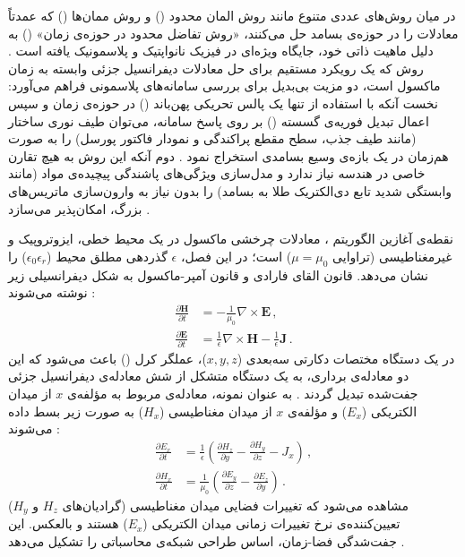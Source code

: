 \documentclass[12pt,a4paper]{report}
\begin{document}
در میان روش‌های عددی متنوع مانند روش المان محدود () و روش ممان‌ها () که عمدتاً معادلات را در حوزه‌ی بسامد حل می‌کنند، «روش تفاضل محدود در حوزه‌ی زمان» () به دلیل ماهیت ذاتی خود، جایگاه ویژه‌ای در فیزیک نانواپتیک و پلاسمونیک یافته است \cite{taflove,novotny}. روش  که یک رویکرد مستقیم برای حل معادلات دیفرانسیل جزئی وابسته به زمان ماکسول است، دو مزیت بی‌بدیل برای بررسی سامانه‌های پلاسمونی فراهم می‌آورد: نخست آنکه با استفاده از تنها یک پالس تحریکی پهن‌باند () در حوزه‌ی زمان و سپس اعمال تبدیل فوریه‌ی گسسته () بر روی پاسخ سامانه، می‌توان طیف نوری ساختار (مانند طیف جذب، سطح مقطع پراکندگی و نمودار فاکتور پورسل) را به صورت هم‌زمان در یک بازه‌ی وسیع بسامدی استخراج نمود \cite{taflove}. دوم آنکه این روش به هیچ تقارن خاصی در هندسه نیاز ندارد و مدل‌سازی ویژگی‌های پاشندگی پیچیده‌ی مواد (مانند وابستگی شدید تابع دی‌الکتریک طلا به بسامد) را بدون نیاز به وارون‌سازی ماتریس‌های بزرگ، امکان‌پذیر می‌سازد \cite{taflove,maier}.

نقطه‌ی آغازین الگوریتم ، معادلات چرخشی ماکسول در یک محیط خطی، ایزوتروپیک و غیرمغناطیسی (تراوایی $\mu=\mu_0$) است؛ در این فصل، $\epsilon$ گذردهی مطلق محیط ($\epsilon_0\epsilon_r$) را نشان می‌دهد. قانون القای فارادی و قانون آمپر-ماکسول به شکل دیفرانسیلی زیر نوشته می‌شوند \cite{taflove,novotny}:
\begin{align}
\frac{\partial\mathbf{H}}{\partial t}&=-\frac{1}{\mu_0}\nabla\times\mathbf{E}\,,\\
\frac{\partial\mathbf{E}}{\partial t}&=\frac{1}{\epsilon}\nabla\times\mathbf{H}-\frac{1}{\epsilon}\mathbf{J}\,.
\end{align}
در یک دستگاه مختصات دکارتی سه‌بعدی ($x,y,z$)، عملگر کرل () باعث می‌شود که این دو معادله‌ی برداری، به یک دستگاه متشکل از شش معادله‌ی دیفرانسیل جزئی جفت‌شده تبدیل گردند \cite{yee,taflove}. به عنوان نمونه، معادله‌ی مربوط به مؤلفه‌ی $x$ از میدان الکتریکی ($E_x$) و مؤلفه‌ی $x$ از میدان مغناطیسی ($H_x$) به صورت زیر بسط داده می‌شوند \cite{yee,taflove}:
\begin{align}
\frac{\partial E_x}{\partial t}&=\frac{1}{\epsilon}\left(\frac{\partial H_z}{\partial y}-\frac{\partial H_y}{\partial z}-J_x\right)\,,\\
\frac{\partial H_x}{\partial t}&=\frac{1}{\mu_0}\left(\frac{\partial E_y}{\partial z}-\frac{\partial E_z}{\partial y}\right)\,.
\end{align}
مشاهده می‌شود که تغییرات فضایی میدان مغناطیسی (گرادیان‌های $H_z$ و $H_y$) تعیین‌کننده‌ی نرخ تغییرات زمانی میدان الکتریکی ($E_x$) هستند و بالعکس. این جفت‌شدگی فضا-زمان، اساس طراحی شبکه‌ی محاسباتی  را تشکیل می‌دهد \cite{yee,taflove}.
\end{document}
